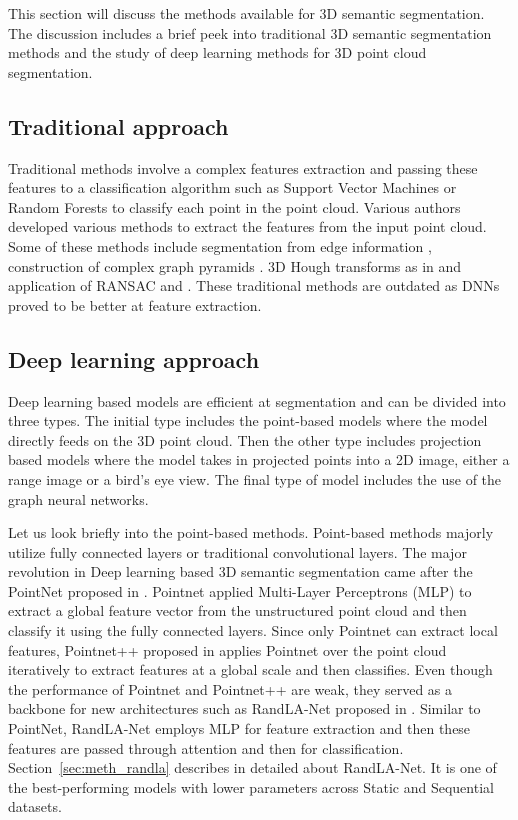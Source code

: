     This section will discuss the methods available for 3D semantic segmentation.
    The discussion includes a brief peek into traditional 3D semantic segmentation methods and the study of deep learning methods for 3D point cloud segmentation.

\subsection{Traditional approach}
Traditional methods involve a complex features extraction and passing these features to a classification algorithm such as Support Vector Machines or Random Forests to classify each point in the point cloud.
Various authors developed various methods to extract the features from the input point cloud.
Some of these methods include segmentation from edge information \cite{bhanu1986range}, construction of complex graph pyramids \cite{koster}.
3D Hough transforms as in \cite{vosselman20013d} and application of RANSAC \cite{schnabel2007efficient} and \cite{tarsha2007hough}.
These traditional methods are outdated as DNNs proved to be better at feature extraction.

\subsection{Deep learning approach}
Deep learning based models are efficient at segmentation and can be divided into three types.
The initial type includes the point-based models where the model directly feeds on the 3D point cloud.
Then the other type includes projection based models where the model takes in projected points into a 2D image, either a range image or a bird's eye view.
The final type of model includes the use of the graph neural networks.

Let us look briefly into the point-based methods. Point-based methods majorly utilize fully connected layers or traditional convolutional layers.
The major revolution in Deep learning based 3D semantic segmentation came after the PointNet proposed in \cite{Qi_2017_CVPR_pointnet}.
Pointnet applied Multi-Layer Perceptrons (MLP) to extract a global feature vector from the unstructured point cloud and then classify it using the fully connected layers.
Since only Pointnet can extract local features, Pointnet++ proposed in \cite{qi2017pointnet++} applies Pointnet over the point cloud iteratively to extract features at a global scale and then classifies.
Even though the performance of Pointnet and Pointnet++ are weak, they served as a backbone for new architectures such as RandLA-Net proposed in \cite{Hu_2020_CVPR_Randla}.
Similar to PointNet, RandLA-Net employs MLP for feature extraction and then these features are passed through attention and then for classification.
 Section~\ref{sec:meth_randla} describes in detailed about RandLA-Net.
It is one of the best-performing models with lower parameters across Static and Sequential datasets.

